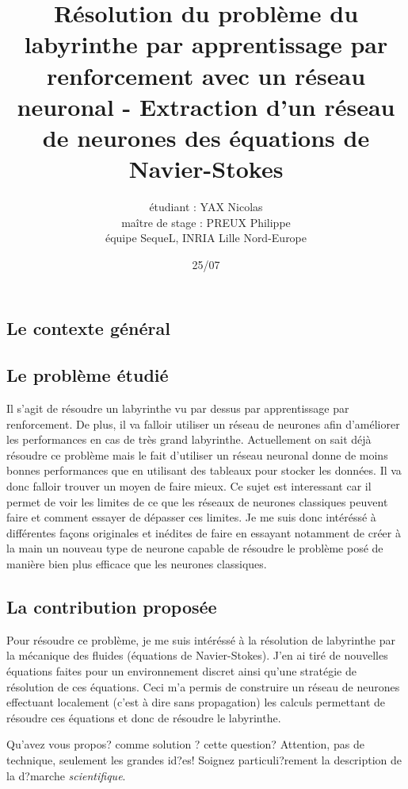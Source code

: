\documentclass{article}
\newenvironment{point}[1]%
{\subsection*{#1}}%
{}
\begin{document}
\title{Résolution du problème du labyrinthe par apprentissage par renforcement avec un réseau neuronal - Extraction d'un réseau de neurones des équations de Navier-Stokes}

\author{étudiant : YAX Nicolas\\maître de stage : PREUX Philippe\\équipe SequeL, INRIA Lille Nord-Europe}

\date{25/07}

\maketitle

\pagestyle{empty} %
\thispagestyle{empty}



\begin{point}{Le contexte général}
  

\end{point}

\begin{point}{Le problème étudié}

Il s'agit de résoudre un labyrinthe vu par dessus par apprentissage par renforcement. De plus, il va falloir utiliser un réseau de neurones afin d'améliorer les performances en cas de très grand labyrinthe. Actuellement on sait déjà résoudre ce problème mais le fait d'utiliser un réseau neuronal donne de moins bonnes performances que en utilisant des tableaux pour stocker les données. Il va donc falloir trouver un moyen de faire mieux. Ce sujet est interessant car il permet de voir les limites de ce que les réseaux de neurones classiques peuvent faire et comment essayer de dépasser ces limites. Je me suis donc intéréssé à différentes façons originales et inédites de faire en essayant notamment de créer à la main un nouveau type de neurone capable de résoudre le problème posé de manière bien plus efficace que les neurones classiques.
\end{point}

\begin{point}{La contribution proposée}
Pour résoudre ce problème, je me suis intéréssé à la résolution de labyrinthe par la mécanique des fluides (équations de Navier-Stokes). J'en ai tiré de nouvelles équations faites pour un environnement discret ainsi qu'une stratégie de résolution de ces équations. Ceci m'a permis de construire un réseau de neurones effectuant localement (c'est à dire sans propagation) les calculs permettant de résoudre ces équations et donc de résoudre le labyrinthe.

  Qu'avez vous propos? comme solution ? cette question? Attention, pas
  de technique, seulement les grandes id?es! Soignez particuli?rement
  la description de la d?marche \emph{scientifique}.
 
\end{point}
\end{document}
